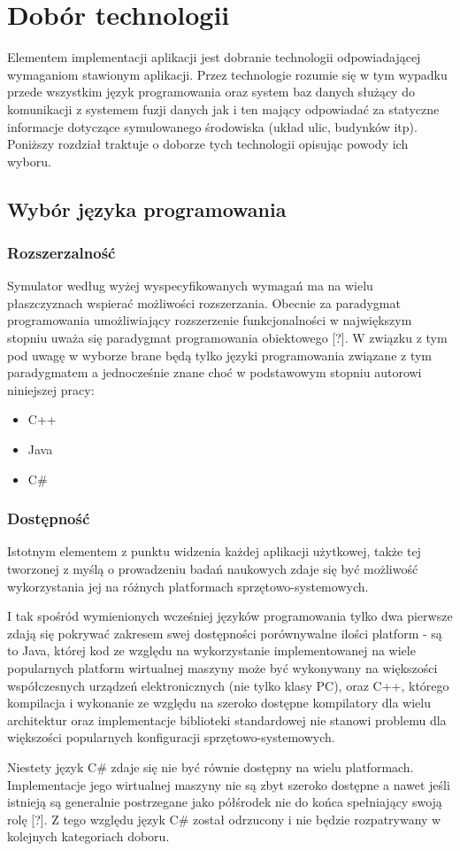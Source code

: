 {\section[Dobór technologii][Dobór technologii]{Dobór technologii}
\par{
Elementem implementacji aplikacji jest dobranie technologii odpowiadającej wymaganiom stawionym aplikacji. Przez technologie rozumie się w tym wypadku przede wszystkim język programowania oraz system baz danych służący do komunikacji z systemem fuzji danych jak i ten mający odpowiadać za statyczne informacje dotyczące symulowanego środowiska (układ ulic, budynków itp).
Poniższy rozdział traktuje o doborze tych technologii opisując powody ich wyboru.
}
\subsection{Wybór języka programowania}
\subsubsection{Rozszerzalność}
\par{
Symulator według wyżej wyspecyfikowanych wymagań ma na wielu płaszczyznach wspierać możliwości rozszerzania. Obecnie za paradygmat programowania umożliwiający rozszerzenie funkcjonalności w największym stopniu uważa się paradygmat programowania obiektowego [?].
W związku z tym pod uwagę w wyborze brane będą tylko języki programowania związane z tym paradygmatem a jednocześnie znane choć w podstawowym stopniu autorowi niniejszej pracy:
\begin{itemize}
\item C++
\item Java
\item C\#
\end{itemize}
}
\subsubsection{Dostępność}
\par{
Istotnym elementem z punktu widzenia każdej aplikacji użytkowej, także tej tworzonej z myślą o prowadzeniu badań naukowych zdaje się być możliwość wykorzystania jej na różnych platformach sprzętowo-systemowych.
}
\par{
I tak spośród wymienionych wcześniej języków programowania tylko dwa pierwsze zdają się pokrywać zakresem swej dostępności porównywalne ilości platform - są to Java, której kod ze względu na wykorzystanie implementowanej na wiele popularnych platform wirtualnej maszyny może być wykonywany na większości współczesnych urządzeń elektronicznych (nie tylko klasy PC), oraz C++, którego kompilacja i wykonanie ze względu na szeroko dostępne kompilatory dla wielu architektur oraz implementacje biblioteki standardowej nie stanowi problemu dla większości popularnych konfiguracji sprzętowo-systemowych.
}
\par{
Niestety język C\# zdaje się nie być równie dostępny na wielu platformach. Implementacje jego wirtualnej maszyny nie są zbyt szeroko dostępne a nawet jeśli istnieją są generalnie postrzegane jako półśrodek nie do końca spełniający swoją rolę [?]. Z tego względu język C\# został odrzucony i nie będzie rozpatrywany w kolejnych kategoriach doboru.
}
}
